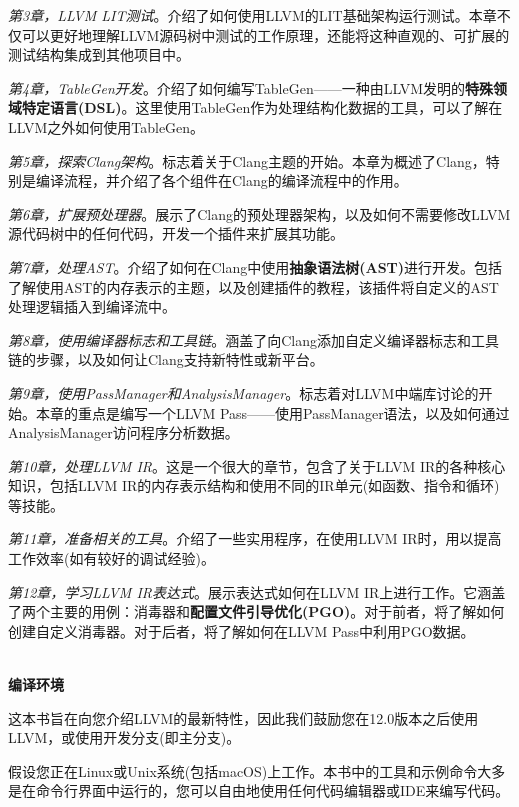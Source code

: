 \textit{第3章，LLVM LIT测试}。介绍了如何使用LLVM的LIT基础架构运行测试。本章不仅可以更好地理解LLVM源码树中测试的工作原理，还能将这种直观的、可扩展的测试结构集成到其他项目中。

\textit{第4章，TableGen开发}。介绍了如何编写TableGen——一种由LLVM发明的\textbf{特殊领域特定语言(DSL)}。这里使用TableGen作为处理结构化数据的工具，可以了解在LLVM之外如何使用TableGen。

\textit{第5章，探索Clang架构}。标志着关于Clang主题的开始。本章为概述了Clang，特别是编译流程，并介绍了各个组件在Clang的编译流程中的作用。

\textit{第6章，扩展预处理器}。展示了Clang的预处理器架构，以及如何不需要修改LLVM源代码树中的任何代码，开发一个插件来扩展其功能。

\textit{第7章，处理AST}。介绍了如何在Clang中使用\textbf{抽象语法树(AST)}进行开发。包括了解使用AST的内存表示的主题，以及创建插件的教程，该插件将自定义的AST处理逻辑插入到编译流中。

\textit{第8章，使用编译器标志和工具链}。涵盖了向Clang添加自定义编译器标志和工具链的步骤，以及如何让Clang支持新特性或新平台。

\textit{第9章，使用PassManager和AnalysisManager}。标志着对LLVM中端库讨论的开始。本章的重点是编写一个LLVM Pass——使用PassManager语法，以及如何通过AnalysisManager访问程序分析数据。

\textit{第10章，处理LLVM IR}。这是一个很大的章节，包含了关于LLVM IR的各种核心知识，包括LLVM IR的内存表示结构和使用不同的IR单元(如函数、指令和循环)等技能。

\textit{第11章，准备相关的工具}。介绍了一些实用程序，在使用LLVM IR时，用以提高工作效率(如有较好的调试经验)。

\textit{第12章，学习LLVM IR表达式}。展示表达式如何在LLVM IR上进行工作。它涵盖了两个主要的用例：消毒器和\textbf{配置文件引导优化(PGO)}。对于前者，将了解如何创建自定义消毒器。对于后者，将了解如何在LLVM Pass中利用PGO数据。

\hspace*{\fill} \\ %
\textbf{编译环境}

这本书旨在向您介绍LLVM的最新特性，因此我们鼓励您在12.0版本之后使用LLVM，或使用开发分支(即主分支)。

假设您正在Linux或Unix系统(包括macOS)上工作。本书中的工具和示例命令大多是在命令行界面中运行的，您可以自由地使用任何代码编辑器或IDE来编写代码。

